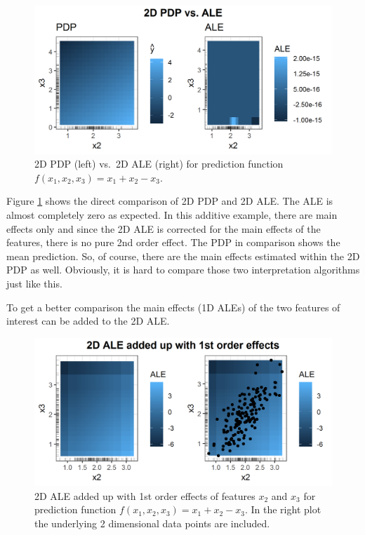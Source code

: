 \documentclass[
]{krantz}
\begin{document}
\begin{figure}
\includegraphics[width=1\linewidth]{images/ale_1_2d_comp_x1_plus_x2_minus_x3_150_0_2_0p5} \caption{2D PDP (left) vs.~2D ALE (right) for prediction function \(f(x_1, x_2, x_3) = x_1 + x_2 - x_3\).}\label{fig:x1px2mx3ale2D}
\end{figure}



Figure \ref{fig:x1px2mx3ale2D} shows the direct comparison of 2D PDP and 2D ALE. The ALE is almost completely zero as expected. In this additive example, there are main effects only and since the 2D ALE is corrected for the main effects of the features, there is no pure 2nd order effect. The PDP in comparison shows the mean prediction. So, of course, there are the main effects estimated within the 2D PDP as well. Obviously, it is hard to compare those two interpretation algorithms just like this.

To get a better comparison the main effects (1D ALEs) of the two features of interest can be added to the 2D ALE.

\begin{figure}
\includegraphics[width=1\linewidth]{images/ale_1_2d_ale_plus_x1_plus_x2_minus_x3_150_0_2_0p5} \caption{2D ALE added up with 1st order effects of features \(x_2\) and \(x_3\) for prediction function \(f(x_1, x_2, x_3) = x_1 + x_2 - x_3\). In the right plot the underlying 2 dimensional data points are included.}\label{fig:ale2DaddedUp}
\end{figure}
\end{document}
